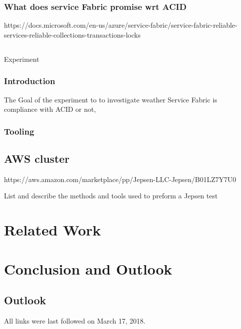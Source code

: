\documentclass[
  a4paper,  %
  twoside,  %
  bibliography=totoc,
  headsepline,
  cleardoublepage=empty,
  parskip=half,
  draft=false
]{scrbook}
\begin{document}
\subsection{What does service Fabric promise wrt ACID}

https://docs.microsoft.com/en-us/azure/service-fabric/service-fabric-reliable-services-reliable-collections-transactions-locks


\section{}{Experiment}

\subsection{Introduction}

The Goal of the experiment to to investigate weather Service Fabric is compliance with ACID or not, 


\subsection{Tooling}

\section{AWS cluster}
https://aws.amazon.com/marketplace/pp/Jepsen-LLC-Jepsen/B01LZ7Y7U0


List and describe the methods and tools used to preform a Jepsen test



\chapter{Related Work}

\chapter{Conclusion and Outlook}
\label{chap:zusfas}

\section*{Outlook}

\printbibliography

All links were last followed on March 17, 2018.
\end{document}
